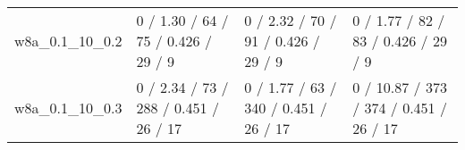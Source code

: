 \begin{tabular}{llll}
            w8a\_0.1\_10\_0.2 &      0 / 1.30 /     64 /      75 / 0.426 /     29 /      9 &      0 / 2.32 /     70 /      91 / 0.426 /     29 /      9 &      0 / 1.77 /     82 /      83 / 0.426 /     29 /      9 \\
            w8a\_0.1\_10\_0.3 &      0 / 2.34 /     73 /     288 / 0.451 /     26 /     17 &      0 / 1.77 /     63 /     340 / 0.451 /     26 /     17 &     0 / 10.87 /    373 /     374 / 0.451 /     26 /     17 \\
\bottomrule
\end{tabular}
